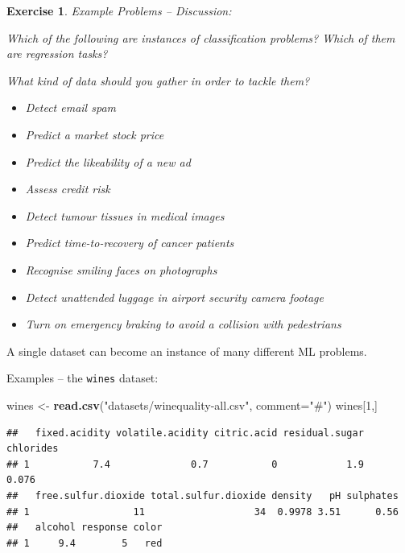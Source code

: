 \documentclass[10pt,b5paper,krantz1]{krantz}
\newenvironment{Shaded}{\begin{snugshade}}{\end{snugshade}}
\newcommand{\DataTypeTok}[1]{\textcolor[rgb]{0.27,0.27,0.27}{#1}}
\newcommand{\DecValTok}[1]{\textcolor[rgb]{0.06,0.06,0.06}{#1}}
\newcommand{\KeywordTok}[1]{\textcolor[rgb]{0.27,0.27,0.27}{\textbf{#1}}}
\newcommand{\NormalTok}[1]{#1}
\newcommand{\StringTok}[1]{\textcolor[rgb]{0.5,0.5,0.5}{#1}}
\providecommand{\tightlist}{%
  \setlength{\itemsep}{0pt}\setlength{\parskip}{0pt}}
\newtheorem{exercise}{Exercise}[chapter]
\begin{document}
\begin{exercise}

Example Problems -- Discussion:

Which of the following are instances of classification problems? Which of them are regression tasks?

What kind of data should you gather in order to tackle them?

\begin{itemize}
\tightlist
\item
  Detect email spam
\item
  Predict a market stock price
\item
  Predict the likeability of a new ad
\item
  Assess credit risk
\item
  Detect tumour tissues in medical images
\item
  Predict time-to-recovery of cancer patients
\item
  Recognise smiling faces on photographs
\item
  Detect unattended luggage in airport security camera footage
\item
  Turn on emergency braking to avoid a collision with pedestrians
\end{itemize}

\end{exercise}

A single dataset can become an instance of many different ML problems.

Examples -- the \texttt{wines} dataset:

\begin{Shaded}
\begin{Highlighting}[]
\NormalTok{wines <-}\StringTok{ }\KeywordTok{read.csv}\NormalTok{(}\StringTok{"datasets/winequality-all.csv"}\NormalTok{, }\DataTypeTok{comment=}\StringTok{"#"}\NormalTok{)}
\NormalTok{wines[}\DecValTok{1}\NormalTok{,]}
\end{Highlighting}
\end{Shaded}

\begin{verbatim}
##   fixed.acidity volatile.acidity citric.acid residual.sugar chlorides
## 1           7.4              0.7           0            1.9     0.076
##   free.sulfur.dioxide total.sulfur.dioxide density   pH sulphates
## 1                  11                   34  0.9978 3.51      0.56
##   alcohol response color
## 1     9.4        5   red
\end{verbatim}
\end{document}
